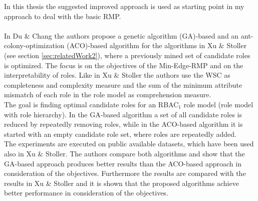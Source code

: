 In this thesis the suggested improved approach is used as starting point in my approach to deal with the basic RMP.\\\\
In Du \& Chang\cite{DuChang} the authors propose a genetic algorithm (GA)-based and an ant-colony-optimization (ACO)-based algorithm for the algorithms in Xu \& Stoller\cite{Xu} (see section \ref{sec:relatedWork2}), where a previously mined set of candidate roles is optimized. The focus is on the objectives of the Min-Edge-RMP and on the interpretability of roles. Like in Xu \& Stoller\cite{Xu} the authors use the WSC as completeness and complexity measure and the sum of the minimum attribute mismatch of each role in the role model as comprehension measure.\\
The goal is finding optimal candidate roles for an RBAC$_1$ role model (role model with role hierarchy). In the GA-based algorithm a set of all candidate roles is reduced by repeatedly removing roles, while in the ACO-based algorithm it is started with an empty candidate role set, where roles are repeatedly added.\\
The experiments are executed on public available datasets, which have been used also in Xu \& Stoller\cite{Xu}. The authors compare both algorithms and show that the GA-based approach produces better results than the ACO-based approach in consideration of the objectives. Furthermore the results are compared with the results in Xu \& Stoller\cite{Xu} and it is shown that the proposed algorithms achieve better performance in consideration of the objectives.